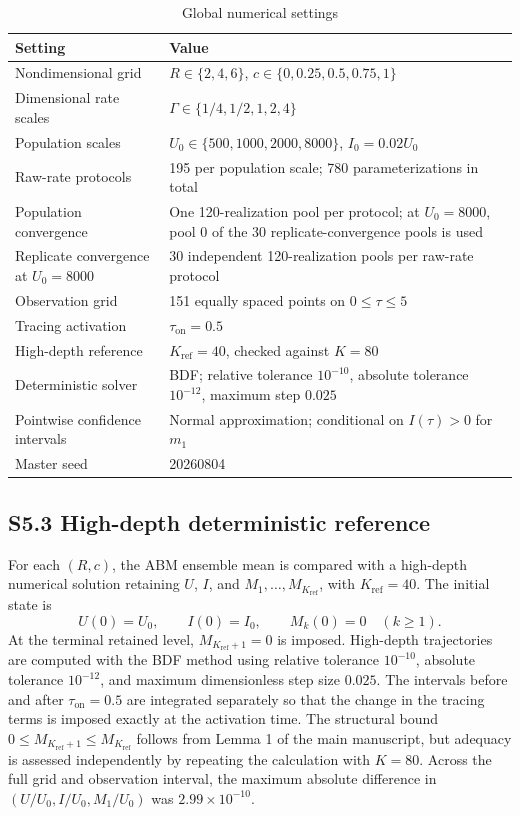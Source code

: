 \documentclass[11pt]{article}
\begin{document}
\begin{table}[H]
\caption{Global numerical settings}
\centering\small
\begin{tabularx}{\textwidth}{@{}p{}X@{}}
\toprule
Setting & Value \\
\midrule
Nondimensional grid & $R\in\{2,4,6\}$, $c\in\{0,0.25,0.5,0.75,1\}$ \\
Dimensional rate scales & $\Gamma\in\{1/4,1/2,1,2,4\}$ \\
Population scales & $U_0\in\{500,1000,2000,8000\}$, $I_0=0.02U_0$ \\
Raw-rate protocols & 195 per population scale; 780 parameterizations in total \\
Population convergence & One 120-realization pool per protocol; at $U_0=8000$, pool 0 of the 30 replicate-convergence pools is used \\
Replicate convergence at $U_0=8000$ & 30 independent 120-realization pools per raw-rate protocol \\
Observation grid & 151 equally spaced points on $0\leq\tau\leq5$ \\
Tracing activation & $\tau_{\mathrm{on}}=0.5$ \\
High-depth reference & $K_{\mathrm{ref}}=40$, checked against $K=80$ \\
Deterministic solver & BDF; relative tolerance $10^{-10}$, absolute tolerance $10^{-12}$, maximum step $0.025$ \\
Pointwise confidence intervals & Normal approximation; conditional on $I(\tau)>0$ for $m_1$ \\
Master seed & 20260804 \\
\bottomrule
\end{tabularx}
\end{table}

\subsection*{S5.3 High-depth deterministic reference}
For each $(R,c)$, the ABM ensemble mean is compared with a high-depth numerical solution retaining $U$, $I$, and $M_1,\ldots,M_{K_{\mathrm{ref}}}$, with $K_{\mathrm{ref}}=40$. The initial state is
\[
U(0)=U_0,\qquad I(0)=I_0,\qquad M_k(0)=0\quad(k\geq1).
\]
At the terminal retained level, $M_{K_{\mathrm{ref}}+1}=0$ is imposed. High-depth trajectories are computed with the BDF method using relative tolerance $10^{-10}$, absolute tolerance $10^{-12}$, and maximum dimensionless step size $0.025$. The intervals before and after $\tau_{\mathrm{on}}=0.5$ are integrated separately so that the change in the tracing terms is imposed exactly at the activation time. The structural bound $0\leq M_{K_{\mathrm{ref}}+1}\leq M_{K_{\mathrm{ref}}}$ follows from Lemma 1 of the main manuscript, but adequacy is assessed independently by repeating the calculation with $K=80$. Across the full grid and observation interval, the maximum absolute difference in $(U/U_0,I/U_0,M_1/U_0)$ was $2.99\times10^{-10}$.
\end{document}
